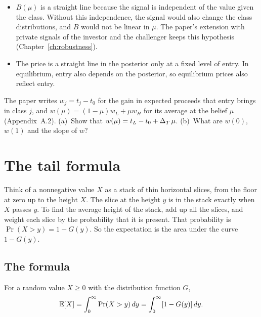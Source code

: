 \begin{watchout}
\begin{itemize}
\item \(B(\mu)\) is a straight line because the signal is independent of the value given the class. Without this
independence, the signal would also change the class distributions, and \(B\) would not be linear in \(\mu\). The
paper's extension with private signals of the investor and the challenger keeps this hypothesis (Chapter~\ref{ch:robustness}).
\item The price is a straight line in the posterior only at a fixed level of entry. In equilibrium, entry also
depends on the posterior, so equilibrium prices also reflect entry.
\end{itemize}
\end{watchout}

\begin{checkyourself}\label{q:toolkit-expectation}
The paper writes \(w_j=t_j-t_0\) for the gain in expected proceeds that entry brings in class \(j\), and
\(w(\mu)=(1-\mu)w_L+\mu w_H\) for its average at the belief \(\mu\) (Appendix~A.2).
(a)~Show that \(w(\mu)=t_L-t_0+\Delta_T\,\mu\).
(b)~What are \(w(0)\), \(w(1)\) and the slope of \(w\)?
\end{checkyourself}

\section{The tail formula}\label{sec:toolkit-tail}

\begin{intuition}
Think of a nonnegative value \(X\) as a stack of thin horizontal slices, from the floor at zero up to the height
\(X\). The slice at the height \(y\) is in the stack exactly when \(X\) passes \(y\). To find the average height of
the stack, add up all the slices, and weight each slice by the probability that it is present. That probability
is \(\Pr(X>y)=1-G(y)\). So the expectation is the area under the curve \(1-G(y)\).
\end{intuition}

\subsection{The formula}

\begin{keyidea}
For a random value \(X\ge0\) with the distribution function \(G\),
\begin{equation}\label{eq:toolkit-tail}
\mathbb{E}[X]=\int_0^\infty\Pr(X>y)\,dy=\int_0^\infty[1-G(y)]\,dy.
\end{equation}
\end{keyidea}

